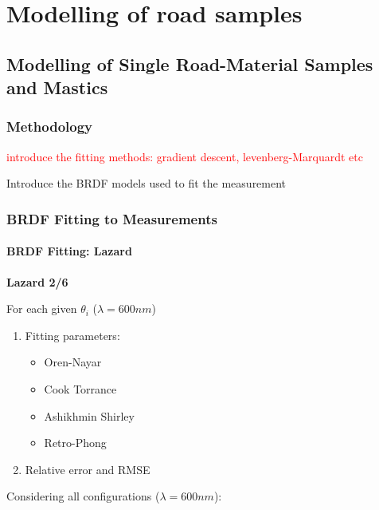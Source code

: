 \chapter{Modelling of road samples}

\section{Modelling of Single Road-Material Samples and Mastics}

\subsection{Methodology}

\textcolor{red}{introduce the fitting methods: gradient descent, levenberg-Marquardt etc}

Introduce the BRDF models used to fit the measurement


\subsection{BRDF Fitting to Measurements}

\subsubsection{BRDF Fitting: Lazard}

\textbf{Lazard 2/6}

For each given $\theta_i$ ($\lambda = 600nm$)

\begin{enumerate}
    \item Fitting parameters:
          \begin{itemize}
              \item Oren-Nayar
              
              \item Cook Torrance
              \item Ashikhmin Shirley
              \item Retro-Phong
          \end{itemize}
    \item Relative error and RMSE
\end{enumerate}



Considering all configurations ($\lambda = 600nm$):


